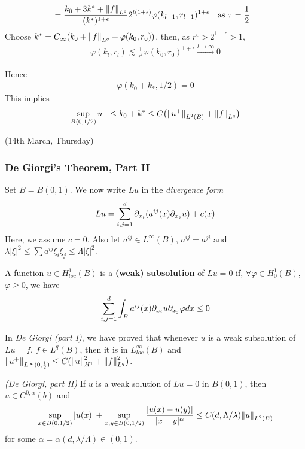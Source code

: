 \documentclass[12pt,a4paper]{article}
\newenvironment{proof}
{\begin{changemargin}{0.5cm}{0.5cm} 
	}%
	{\end{changemargin}
}
\newenvironment{p}
{\begin{proof} 
	}%
	{\end{proof}
}
\begin{document}
\begin{p}
\begin{itemize}
\begin{align*}
&= \frac{k_0 + 3k^* + \snorms{f}{L^q}}{(k^*)^{1+ \epsilon}}  2^{l(1+\epsilon)} \varphi(k_{l-1},r_{l-1} )^{1+ \epsilon} \quad \text{as } \tau=\frac{1}{2}
\end{align*}
Choose $k^* = C_{\infty} (k_0 + \snorms{f}{L^q} + \varphi(k_0, r_0))$, then, as $r^{\epsilon} > 2^{1+\epsilon} >1$,
\begin{align*}
\varphi(k_l, r_l) \lesssim \frac{1}{r^l} \varphi(k_0, r_0)^{1+\epsilon} \xrightarrow{l\rightarrow\infty} 0
\end{align*}
\end{itemize}
Hence
\begin{align*}
\varphi(k_0 + k_*, 1/2) =0
\end{align*}
This implies
\begin{align*}
\sup_{B(0,1/2)} u^+ \leq k_0 + k^* \leq C \big( \snorms{u^+}{L^2(B)} + \snorms{f}{L^q} \big)
\end{align*}
\eop 
\end{p}
\s

\newday

(14th March, Thursday)

\subsubsection*{De Giorgi's Theorem, Part II}

Set $B= B(0,1)$. We now write $Lu$ in the \emph{divergence form}
\begin{align*}
Lu = \sum_{i,j=1}^d \partial_{x_i}(a^{ij}(x) \partial_{x_j} u) + c(x)
\end{align*}
Here, we assume $c=0$. Also let $a^{ij} \in L^{\infty}(B)$, $a^{ij}= a^{ji}$ and $\lambda |\xi|^2 \leq \sum a^{ij} \xi_i \xi_j \leq \Lambda |\xi|^2$. 
\s

 A function $u\in H^1_{loc}(B)$ is a \textbf{(weak) subsolution} of $Lu =0$ if, $\forall \varphi \in H_0^1(B)$, $\varphi \geq 0$, we have
\begin{align*}
\sum_{i,j=1}^d \int_B a^{ij}(x) \partial_{x_i} u \partial_{x_j} \varphi dx \leq 0
\end{align*}
\s

In \emph{De Giorgi (part I)}, we have proved that whenever $u$ is a weak subsolution of $Lu = f$, $f\in L^q(B)$, then it is in $L^{\infty}_{loc}(B)$ and $\snorms{u^+}{L^{\infty}(0, \frac{1}{2})} \leq C(\snorms{u}{H^1}^2 + \snorms{f}{L^q}^2)$.
\s

\thm \emph{(De Giorgi, part II)} If $u$ is a weak solution of $Lu=0$ in $B(0, 1)$, then $u\in C^{0, \alpha}(b)$ and
\begin{align*}
\sup_{x\in B(0, 1/2)} |u(x)| + \sup_{x,y\in B(0, 1/2)} \frac{|u(x) - u(y)|}{|x-y|^{\alpha}} \leq C(d, \Lambda/\lambda)\snorms{u}{L^2(B)}
\end{align*}
for some $\alpha = \alpha(d, \lambda/\Lambda) \in (0,1)$.
\s
\end{document}
